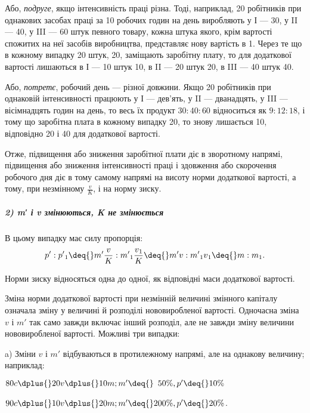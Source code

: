 Або, \emph{подруге}, якщо інтенсивність праці різна. Тоді, наприклад,
20 робітників при однакових засобах праці за 10 робочих
годин на день виробляють у І — 30, у II — 40, у III — 60 штук
певного товару, кожна штука якого, крім вартості спожитих
на неї засобів виробництва, представляє нову вартість в 1. Через те що в кожному випадку 20 штук, \deq{} 20, заміщають заробітну плату, то для додаткової
вартості лишаються в І — 10 штук \deq{} 10,
в II — 20 штук \deq{} 20, в III — 40 штук \deq{} 40.

Або, \emph{потретє}, робочий день — різної довжини. Якщо 20 робітників
при однаковій інтенсивності працюють у І — дев’ять,
у II — дванадцять, у III — вісімнадцять годин на день, то весь їх
продукт $30 : 40 : 60$ відноситься як $9 : 12 : 18$, і тому що заробітна
плата в кожному випадку \deq{} 20, то знову лишається 10, відповідно
20 і 40 для додаткової вартості.

Отже, підвищення або зниження заробітної плати діє в зворотному
напрямі, підвищення або зниження інтенсивності праці
і здовження або скорочення робочого дня діє в тому самому
напрямі на висоту норми додаткової вартості, а тому, при незмінному
$\frac{v}{K}$, і на норму зиску.

\subparagraph*{2) m′ і v змінюються, K не змінюється}
В цьому випадку має силу пропорція:\[
p': p'\textsubscript{1} \deq{} m' \frac{v}{K} : m'\textsubscript{1} \frac{v\textsubscript{1}}{K} \deq{} m'v : m'\textsubscript{1}v\textsubscript{1} \deq{} m : m\textsubscript{1}.\]

Норми зиску відносяться одна до одної, як відповідні маси
додаткової вартості.

Зміна норми додаткової вартості при незмінній величині змінного
капіталу означала зміну у величині й розподілі нововиробленої
вартості. Одночасна зміна $v$ і $m'$ так само завжди включає
інший розподіл, але не завжди зміну величини нововиробленої
вартості. Можливі три випадки:

a) Зміни $v$ і $m'$ відбуваються в протилежному напрямі, але
на однакову величину; наприклад:
\begin{center}
$80 c \dplus{} 20 v \dplus{} 10 m; m' \deq{} \phantom{0}50\%, p' \deq{} 10\%$

$90 c \dplus{} 10 v \dplus{} 20 m; m' \deq{} 200\%, p' \deq{} 20\%$.
\end{center}

